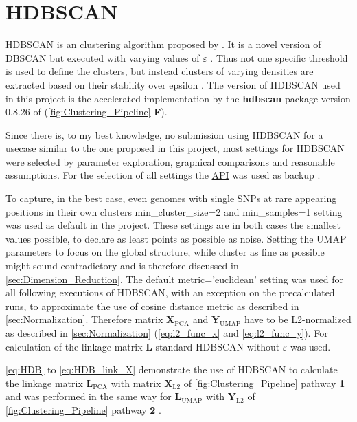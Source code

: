 \section{HDBSCAN} \label{sec:HDBSCAN}

\gls{HDBSCAN} is an clustering algorithm proposed by \textcite{campello_hierarchical_2015, hutchison_density-based_2013}. It is a novel version of \gls{DBSCAN} but executed with varying values of $\varepsilon$ \autocite{hutchison_density-based_2013}. Thus not one specific threshold is used to define the clusters, but instead clusters of varying densities are extracted based on their stability over epsilon \autocite{mcinnes_hdbscan_2017}. The version of \gls{HDBSCAN} used in this project is the accelerated implementation by the \textbf{hdbscan} package version 0.8.26 of \textcite{mcinnes_accelerated_2017} (\autoref{fig:Clustering_Pipeline} \textsf{\textbf{F}}).

Since there is, to my best knowledge, no submission using \gls{HDBSCAN} for a usecase similar to the one proposed in this project, most settings for \gls{HDBSCAN} were selected by parameter exploration, graphical comparisons and reasonable assumptions. For the selection of all settings the \href{https://hdbscan.readthedocs.io/en/latest/api.html}{API} was used as backup \autocite{mcinnes_hdbscan_2017}. 

To capture, in the best case, even genomes with single \glspl{SNP} at rare appearing positions in their own clusters \colorbox{backcolour}{min\_cluster\_size=2} and \colorbox{backcolour}{min\_samples=1} setting was used as default in the project. These settings are in both cases the smallest values possible, to declare as least points as possible as noise. Setting the \gls{UMAP} parameters to focus on the global structure, while cluster as fine as possible might sound contradictory and is therefore discussed in \autoref{sec:Dimension_Reduction}. The default \colorbox{backcolour}{metric='euclidean'} setting was used for all following executions of \gls{HDBSCAN}, with an exception on the precalculated runs, to approximate the use of cosine distance metric as described in \autoref{sec:Normalization}. Therefore matrix $\mathbf{X}_{\text{PCA}}$ and $\mathbf{Y}_{\text{UMAP}}$ have to be L2-normalized as described in \autoref{sec:Normalization} (\autoref{eq:l2_func_x} and \autoref{eq:l2_func_y}). For calculation of the linkage matrix $\mathbf{L}$ standard \gls{HDBSCAN} without $\varepsilon$ was used.

\autoref{eq:HDB} to \autoref{eq:HDB_link_X} demonstrate the use of \gls{HDBSCAN} to calculate the linkage matrix $\mathbf{L}_{\text{PCA}}$ with matrix $\mathbf{X}_{\text{L2}}$ of \autoref{fig:Clustering_Pipeline} pathway \textsf{\textbf{1}} and was performed in the same way for $\mathbf{L}_{\text{UMAP}}$ with $\mathbf{Y}_{\text{L2}}$ of \autoref{fig:Clustering_Pipeline} pathway \textsf{\textbf{2}} \autocite{mcinnes_hdbscan_2017, gower_minimum_1969}.

